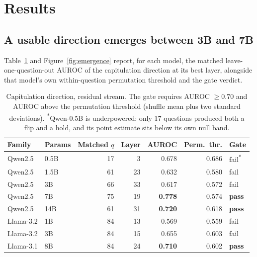 
\section{Results}

\subsection{A usable direction emerges between 3B and 7B}
\label{sec:h1}

Table~\ref{tab:h1} and Figure~\ref{fig:emergence} report, for each model, the matched leave-one-question-out AUROC of the
capitulation direction at its best layer, alongside that model's own within-question
permutation threshold and the gate verdict.

\begin{table}[t]
\centering
\small
\begin{tabular}{llrrrrl}
\toprule
Family & Params & Matched $q$ & Layer & AUROC & Perm.\ thr. & Gate \\
\midrule
Qwen2.5   & 0.5B & 17 & 3  & 0.678 & 0.686 & fail\textsuperscript{*} \\
Qwen2.5   & 1.5B & 61 & 23 & 0.632 & 0.580 & fail \\
Qwen2.5   & 3B   & 66 & 33 & 0.617 & 0.572 & fail \\
Qwen2.5   & 7B   & 75 & 19 & \textbf{0.778} & 0.574 & \textbf{pass} \\
Qwen2.5   & 14B  & 61 & 31 & \textbf{0.720} & 0.618 & \textbf{pass} \\
\midrule
Llama-3.2 & 1B   & 84 & 13 & 0.569 & 0.559 & fail \\
Llama-3.2 & 3B   & 84 & 15 & 0.655 & 0.603 & fail \\
Llama-3.1 & 8B   & 84 & 24 & \textbf{0.710} & 0.602 & \textbf{pass} \\
\bottomrule
\end{tabular}
\caption{Capitulation direction, residual stream. The gate requires AUROC $\geq 0.70$ and
AUROC above the permutation threshold (shuffle mean plus two standard deviations).
\textsuperscript{*}Qwen-0.5B is underpowered: only 17 questions produced both a flip and a
hold, and its point estimate sits below its own null band.}
\label{tab:h1}
\end{table}


